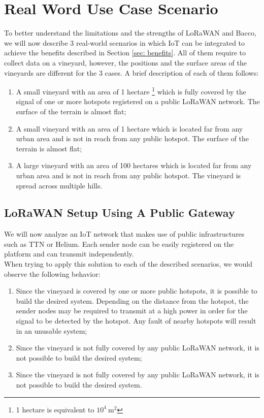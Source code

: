 \section{Real Word Use Case Scenario}
To better understand the limitations and the strengths of LoRaWAN and Bacco, we will now describe 3 real-world scenarios
in which \gls{IoT} can be integrated to achieve the benefits described in Section \ref{sec: benefits}. All of them
require to collect data on a vineyard, however, the positions and the surface areas of the vineyards are
different for the 3 cases. A brief description of each of them follows:
\begin{enumerate}
    \item A small vineyard with an area of 1 hectare \footnote{1 hectare is equivalent to $10^4~\mathrm{m^2}$} which is
        fully covered by the signal of one or more hotspots registered on a public LoRaWAN
        network. The surface of the terrain is almost flat;
    \item A small vineyard with an area of 1 hectare which is located far from any urban area and is not
        in reach from any public hotspot. The surface of the terrain is almost flat;
    \item A large vineyard with an area of 100 hectares which is located far from any urban area and is not in reach
        from any public hotspot. The vineyard is spread across multiple hills.
\end{enumerate}

\subsection{LoRaWAN Setup Using A Public Gateway}
We will now analyze an \gls{IoT} network that makes use of public infrastructures such as
\gls{TTN} or Helium. Each sender node can be easily registered on the platform and can transmit independently.\\
When trying to apply this solution to each of the described scenarios, we would observe the following behavior:
\begin{enumerate}
    \item Since the vineyard is covered by one or more public hotspots, it is possible to build the desired system.
        Depending on the distance from the hotspot, the sender nodes may be required to transmit at a high power in
        order for the signal to be detected by the hotspot. Any fault of nearby hotspots will result in an unusable
        system;
    \item Since the vineyard is not fully covered by any public LoRaWAN network, it is not possible to build the desired
        system;
    \item Since the vineyard is not fully covered by any public LoRaWAN network, it is not possible to build the desired
        system.
\end{enumerate}

